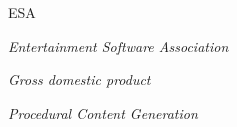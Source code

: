 \documentclass[tg]{mdtuffs}
\begin{document}

\begin{listofabbrv}{ESA}
\item [ESA] \textit{Entertainment Software Association}
\item [GDP] \textit{Gross domestic product}
\item [PCG] \textit{Procedural Content Generation}
    
\end{listofabbrv}



\tableofcontents


\setlength{\baselineskip}{1.5\baselineskip}






\setlength{\baselineskip}{\baselineskip}

%


\end{document}
